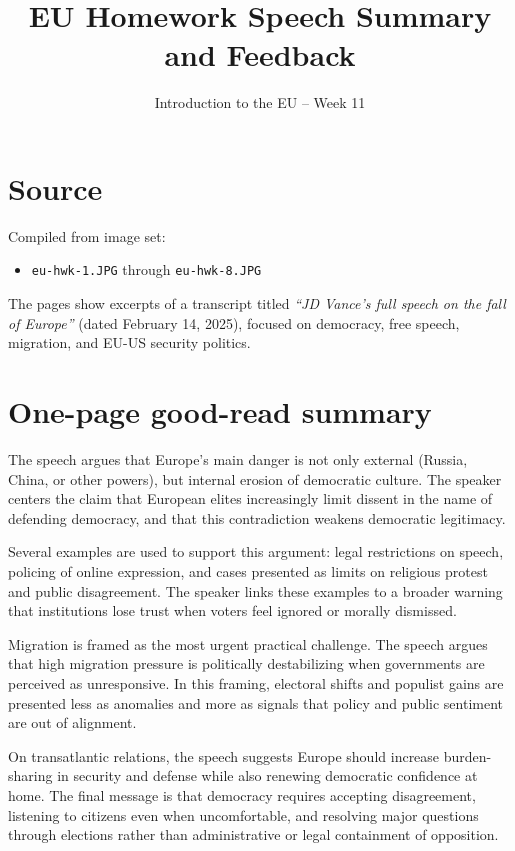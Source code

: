 \documentclass[12pt]{article}
\title{EU Homework Speech Summary and Feedback}
\author{Introduction to the EU -- Week 11}
\date{}
\begin{document}
\maketitle

\section*{Source}

Compiled from image set:
\begin{itemize}
    \item \texttt{eu-hwk-1.JPG} through \texttt{eu-hwk-8.JPG}
\end{itemize}

The pages show excerpts of a transcript titled \textit{``JD Vance's full speech on the fall of Europe''} (dated February 14, 2025), focused on democracy, free speech, migration, and EU-US security politics.

\section*{One-page good-read summary}

The speech argues that Europe's main danger is not only external (Russia, China, or other powers), but internal erosion of democratic culture. The speaker centers the claim that European elites increasingly limit dissent in the name of defending democracy, and that this contradiction weakens democratic legitimacy.

Several examples are used to support this argument: legal restrictions on speech, policing of online expression, and cases presented as limits on religious protest and public disagreement. The speaker links these examples to a broader warning that institutions lose trust when voters feel ignored or morally dismissed.

Migration is framed as the most urgent practical challenge. The speech argues that high migration pressure is politically destabilizing when governments are perceived as unresponsive. In this framing, electoral shifts and populist gains are presented less as anomalies and more as signals that policy and public sentiment are out of alignment.

On transatlantic relations, the speech suggests Europe should increase burden-sharing in security and defense while also renewing democratic confidence at home. The final message is that democracy requires accepting disagreement, listening to citizens even when uncomfortable, and resolving major questions through elections rather than administrative or legal containment of opposition.
\end{document}
